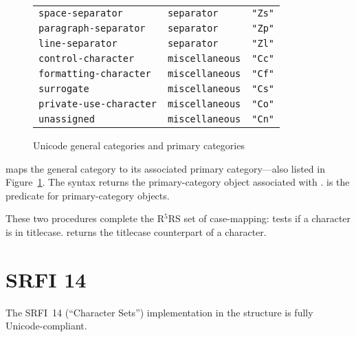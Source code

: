 \begin{figure}[tb]
\begin{tabular}{l|l|l}
   \texttt{space-separator} & \texttt{separator} & \verb|"Zs"| \\
   \texttt{paragraph-separator} & \texttt{separator} & \verb|"Zp"| \\
   \texttt{line-separator} & \texttt{separator} & \verb|"Zl"| \\[1ex]

   \texttt{control-character} & \texttt{miscellaneous} & \verb|"Cc"| \\
   \texttt{formatting-character} & \texttt{miscellaneous} & \verb|"Cf"| \\
   \texttt{surrogate} & \texttt{miscellaneous} & \verb|"Cs"| \\
   \texttt{private-use-character} & \texttt{miscellaneous} & \verb|"Co"| \\
   \texttt{unassigned} & \texttt{miscellaneous} & \verb|"Cn"|
\end{tabular}
  
  \caption{Unicode general categories and primary categories}
  \label{fig:unicode-categories}
\end{figure}

\begin{protos}
\end{protos}
%
 maps the general category to
its associated primary category---also listed in
Figure~\ref{fig:unicode-categories}.  The 
syntax returns the primary-category object associated with
.   is the
predicate for primary-category objects.

\begin{protos}
\end{protos}
%
These two procedures complete the R$^5$RS set of case-mapping:
 tests if a character is in titlecase.
 returns the titlecase counterpart of a
character.

\section{SRFI 14}

The SRFI~14 (``Character Sets'') implementation in the 
structure is fully Unicode-compliant.

